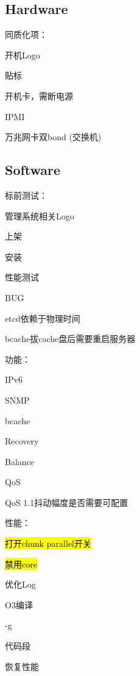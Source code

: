 \subsection{Hardware}

同质化项：
\begin{enumbox}
\item 开机Logo
\item 贴标
\item 开机卡，需断电源
\item IPMI
\item 万兆网卡双bond (交换机)
\end{enumbox}

\subsection{Software}

标前测试：
\begin{enumbox}
\item 管理系统相关Logo
\item 上架
\item 安装
\item 性能测试
\end{enumbox}

BUG
\begin{enumbox}
\item etcd依赖于物理时间
\item bcache拔cache盘后需要重启服务器
\end{enumbox}

功能：
\begin{enumbox}
\item IPv6
\item SNMP
\item bcache
\item Recovery
\item Balance
\item QoS
\item QoS 1.1抖动幅度是否需要可配置
\end{enumbox}

性能：
\begin{enumbox}
\item \hl{打开chunk parallel开关}
\item \hl{禁用core}
\item 优化Log
\item O3编译
\item -g
\item 代码段
\item 恢复性能
\end{enumbox}

